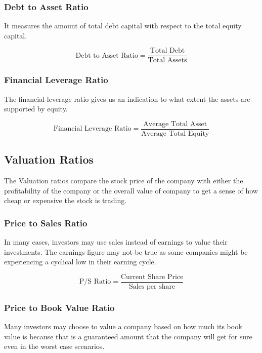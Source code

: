 \subsubsection{Debt to Asset Ratio}
It measures the amount of total debt capital with respect to the total equity capital.

\begin{displaymath}
  \textrm{Debt to Asset Ratio} = \frac{\textrm{Total Debt}}{\textrm{Total Assets}}
\end{displaymath}

\subsubsection{Financial Leverage Ratio}
The financial leverage ratio gives us an indication to what extent the assets are supported by equity.

\begin{displaymath}
  \textrm{Financial Leverage Ratio} = \frac{\textrm{Average Total Asset}}{\textrm{Average Total Equity}}
\end{displaymath}

\subsection{Valuation Ratios}
The Valuation ratios compare the stock price of the company with either the profitability of the company or the overall value of company to get a sense of how cheap or expensive the stock is trading.

\subsubsection{Price to Sales Ratio}
In many cases, investors may use sales instead of earnings to value their investments. The earnings figure may not be true as some companies might be experiencing a cyclical low in their earning cycle.

\begin{displaymath}
  \textrm{P/S Ratio} = \frac{\textrm{Current Share Price}}{\textrm{Sales per share}}
\end{displaymath}

\subsubsection{Price to Book Value Ratio}
Many investors may choose to value a company based on how much its book value is because that is a guaranteed amount that the company will get for sure even in the worst case scenarios.

